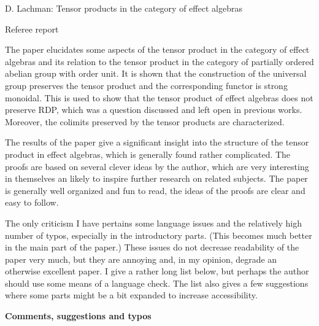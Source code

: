 \documentclass[12pt]{article}
\begin{document}
\begin{center}
{\large D. Lachman:  Tensor products in the category of effect algebras}

\end{center}
\medskip

\centerline{Referee report}

\bigskip

The paper elucidates some aspects of the tensor product in the category of effect algebras
and its relation to the tensor product in the category of partially ordered abelian group
with order unit. It is shown that the construction of the universal group preserves the
tensor product and the corresponding functor is strong monoidal. This is used to show that
the tensor product of effect algebras does not preserve RDP, which was a question
discussed and left open in previous works. Moreover, the colimits preserved by the tensor
products are characterized.

The results of the paper give a significant insight into the structure of the tensor
product in effect algebras, which is generally found rather complicated. The proofs are
based on several clever ideas by the author, which are very interesting in themselves an likely
to inspire further research on related subjects. The paper is generally well organized and fun to read, 
the ideas of the proofs are clear and  easy to follow. 

The only criticism I have pertains
some language issues and the relatively high number of typos, especially in the
introductory parts. (This becomes much better in the main part of the paper.) These issues
do not decrease readability of the paper very much, but they are annoying and, in my
opinion, degrade an otherwise excellent paper. I give a rather long list below, but 
perhaps the author should use some means of a language check. The list also gives a
few suggestions where some parts might be a bit expanded to increase accessibility. 

\bigskip

\noindent
\textbf{Comments, suggestions and typos}
\end{document}
